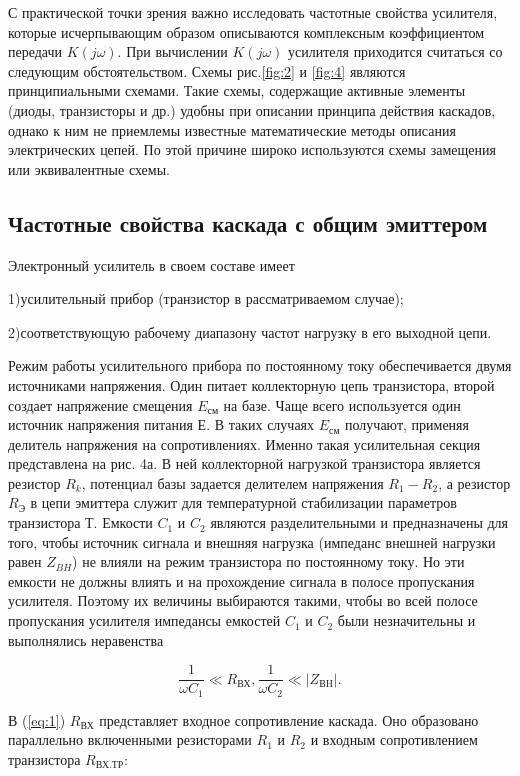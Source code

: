 С практической точки зрения важно исследовать частотные свойства усилителя, которые исчерпывающим образом описываются комплексным коэффициентом передачи $K(j\omega)$. При вычислении $K(j\omega)$ усилителя приходится считаться со следующим обстоятельством. Схемы рис.\ref{fig:2} и \ref{fig:4} являются принципиальными схемами. Такие схемы, содержащие активные элементы (диоды, транзисторы и др.) удобны при описании принципа действия каскадов, однако к ним не приемлемы известные математические методы описания электрических цепей. По этой причине широко используются схемы замещения или эквивалентные схемы.

\subsection{\textbf{Частотные свойства каскада с общим эмиттером}}
Электронный усилитель в своем составе имеет 

1)усилительный прибор (транзистор в рассматриваемом случае);

2)соответствующую рабочему диапазону частот нагрузку в его
выходной цепи.

Режим работы усилительного прибора по постоянному току обеспечивается двумя источниками напряжения. Один питает коллекторную цепь транзистора, второй создает
напряжение смещения $E_{\text{см}}$ на базе. Чаще всего используется один источник напряжения питания Е. В таких случаях $E_{\text{см}}$ получают, применяя делитель напряжения на сопротивлениях. Именно такая усилительная секция представлена на рис. 4а. В ней коллекторной нагрузкой транзистора является резистор $R_k$, потенциал базы
задается делителем напряжения $R_1-R_2$, а резистор $R_{\text{Э}}$ в цепи эмиттера служит для температурной стабилизации параметров транзистора Т. Емкости $C_1$ и $C_2$ являются разделительными и предназначены для того, чтобы источник сигнала и внешняя нагрузка (импеданс внешней нагрузки равен $Z_{BH}$) не влияли на режим транзистора по постоянному току. Но эти емкости не должны влиять и на прохождение сигнала в полосе пропускания усилителя. Поэтому их величины выбираются такими, чтобы во всей полосе пропускания усилителя импедансы емкостей $C_1$ и $C_2$ были незначительны и выполнялись неравенства

\begin{equation}
	\frac{1}{\omega C_1}\ll R_{\text{ВХ}}, \frac{1}{\omega C_2}\ll |Z_{\text{ВH}}|.
	\label{eq:1}
\end{equation}

В (\ref{eq:1}) $R_{\text{ВХ}}$ представляет входное сопротивление каскада. Оно образовано параллельно включенными резисторами $R_1$ и $R_2$ и входным  сопротивлением транзистора $R_{\text{ВХ.ТР}}$:

